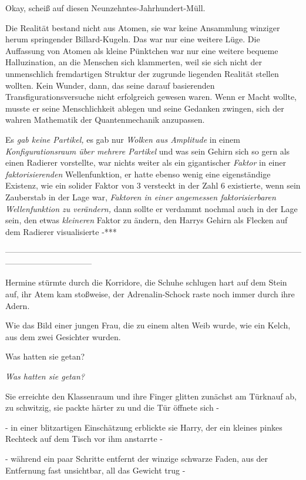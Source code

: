 {Okay, scheiß auf diesen Neunzehntes-Jahrhundert-Müll.

Die Realität bestand nicht aus Atomen, sie war keine Ansammlung winziger herum springender Billard-Kugeln. Das war nur eine weitere Lüge. Die Auffassung von Atomen als kleine Pünktchen war nur eine weitere bequeme Halluzination, an die Menschen sich klammerten, weil sie sich nicht der unmenschlich fremdartigen Struktur der zugrunde liegenden Realität stellen wollten. Kein Wunder, dann, das seine darauf basierenden Transfigurationsversuche nicht erfolgreich gewesen waren. Wenn er Macht wollte, musste er seine Menschlichkeit ablegen und seine Gedanken zwingen, sich der wahren Mathematik der Quantenmechanik anzupassen.

Es \emph{gab keine Partikel,} es gab nur \emph{Wolken aus Amplitude} in einem \emph{Konfigurationsraum über mehrere Partikel} und was sein Gehirn sich so gern als einen Radierer vorstellte, war nichts weiter als ein gigantischer \emph{Faktor} in einer \emph{faktorisierenden} Wellenfunktion, er hatte ebenso wenig eine eigenständige Existenz, wie ein solider Faktor von 3 versteckt in der Zahl 6 existierte, wenn sein Zauberstab in der Lage war, \emph{Faktoren in einer angemessen faktorisierbaren Wellenfunktion zu verändern,} dann sollte er verdammt nochmal auch in der Lage sein, den etwas \emph{kleineren} Faktor zu ändern, den Harrys Gehirn als Flecken auf dem Radierer visualisierte -***

--------------------------------------------------------------------------------------------------------------------------------------------

Hermine stürmte durch die Korridore, die Schuhe schlugen hart auf dem Stein auf, ihr Atem kam stoßweise, der Adrenalin-Schock raste noch immer durch ihre Adern.

Wie das Bild einer jungen Frau, die zu einem alten Weib wurde, wie ein Kelch, aus dem zwei Gesichter wurden.

Was hatten sie getan?

\emph{Was hatten sie getan?}

Sie erreichte den Klassenraum und ihre Finger glitten zunächst am Türknauf ab, zu schwitzig, sie packte härter zu und die Tür öffnete sich -

- in einer blitzartigen Einschätzung erblickte sie Harry, der ein kleines pinkes Rechteck auf dem Tisch vor ihm anstarrte -

- während ein paar Schritte entfernt der winzige schwarze Faden, aus der Entfernung fast unsichtbar, all das Gewicht trug -

}
